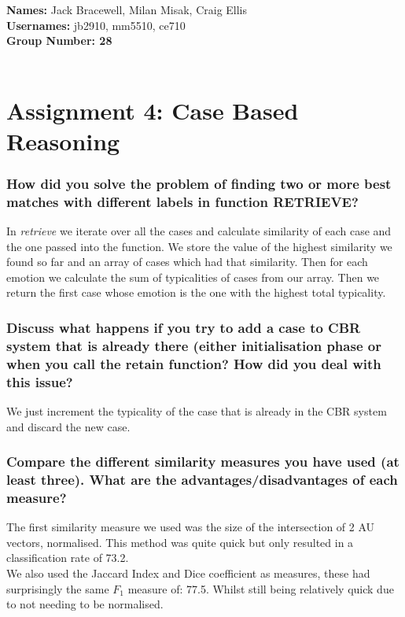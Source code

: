 \documentclass[12pt]{article}
\begin{document}
{\bf Names:} Jack Bracewell, Milan Misak, Craig Ellis \\
{\bf Usernames:} jb2910, mm5510, ce710 \\
{\bf Group Number: 28}  \\ \\

\section*{Assignment 4: Case Based Reasoning}

\subsubsection*{How did you solve the problem of finding two or more best matches with different labels in function RETRIEVE?}

In \emph{retrieve} we iterate over all the cases and calculate similarity of each case and the one passed into the function. We store the value of the highest similarity we found so far and an array of cases which had that similarity. Then for each emotion we calculate the sum of typicalities of cases from our array. Then we return the first case whose emotion is the one with the highest total typicality.


\subsubsection*{Discuss what happens if you try to add a case to CBR system that is already there (either initialisation phase or when you call the retain function? How did you deal with this issue?}

We just increment the typicality of the case that is already in the CBR system and discard the new case. 

\subsubsection*{Compare the different similarity measures you have used (at least three). What are the advantages/disadvantages of each measure?}

The first similarity measure we used was the size of the intersection of 2 AU vectors, normalised. This method was quite quick but only resulted in a classification rate of 73.2. \\ 

We also used the Jaccard Index and Dice coefficient as measures, these had surprisingly the same $F_1$ measure of: 77.5. Whilst still being relatively quick due to not needing to be normalised.\\
\end{document}
